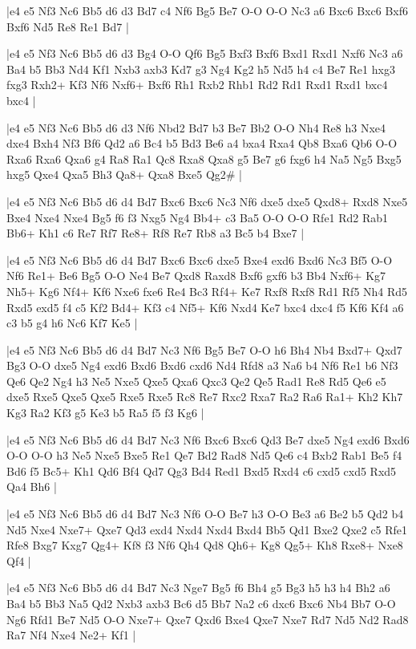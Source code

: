 \whitename{}
\blackname{}
\makegametitle
|e4 e5 Nf3 Nc6 Bb5 d6 d3 Bd7 c4 Nf6 Bg5 Be7 O-O O-O Nc3 a6 Bxc6 Bxc6 Bxf6 Bxf6 Nd5 Re8 Re1 Bd7  |

\whitename{}
\blackname{}
\makegametitle
|e4 e5 Nf3 Nc6 Bb5 d6 d3 Bg4 O-O Qf6 Bg5 Bxf3 Bxf6 Bxd1 Rxd1 Nxf6 Nc3 a6 Ba4 b5 Bb3 Nd4 Kf1 Nxb3 axb3 Kd7 g3 Ng4 Kg2 h5 Nd5 h4 c4 Be7 Re1 hxg3 fxg3 Rxh2+ Kf3 Nf6 Nxf6+ Bxf6 Rh1 Rxb2 Rhb1 Rd2 Rd1 Rxd1 Rxd1 bxc4 bxc4  |

\whitename{}
\blackname{}
\makegametitle
|e4 e5 Nf3 Nc6 Bb5 d6 d3 Nf6 Nbd2 Bd7 b3 Be7 Bb2 O-O Nh4 Re8 h3 Nxe4 dxe4 Bxh4 Nf3 Bf6 Qd2 a6 Bc4 b5 Bd3 Be6 a4 bxa4 Rxa4 Qb8 Bxa6 Qb6 O-O Rxa6 Rxa6 Qxa6 g4 Ra8 Ra1 Qc8 Rxa8 Qxa8 g5 Be7 g6 fxg6 h4 Na5 Ng5 Bxg5 hxg5 Qxe4 Qxa5 Bh3 Qa8+ Qxa8 Bxe5 Qg2\#  |

\whitename{}
\blackname{}
\makegametitle
|e4 e5 Nf3 Nc6 Bb5 d6 d4 Bd7 Bxc6 Bxc6 Nc3 Nf6 dxe5 dxe5 Qxd8+ Rxd8 Nxe5 Bxe4 Nxe4 Nxe4 Bg5 f6 f3 Nxg5 Ng4 Bb4+ c3 Ba5 O-O O-O Rfe1 Rd2 Rab1 Bb6+ Kh1 c6 Re7 Rf7 Re8+ Rf8 Re7 Rb8 a3 Bc5 b4 Bxe7  |

\whitename{}
\blackname{}
\makegametitle
|e4 e5 Nf3 Nc6 Bb5 d6 d4 Bd7 Bxc6 Bxc6 dxe5 Bxe4 exd6 Bxd6 Nc3 Bf5 O-O Nf6 Re1+ Be6 Bg5 O-O Ne4 Be7 Qxd8 Raxd8 Bxf6 gxf6 b3 Bb4 Nxf6+ Kg7 Nh5+ Kg6 Nf4+ Kf6 Nxe6 fxe6 Re4 Bc3 Rf4+ Ke7 Rxf8 Rxf8 Rd1 Rf5 Nh4 Rd5 Rxd5 exd5 f4 c5 Kf2 Bd4+ Kf3 c4 Nf5+ Kf6 Nxd4 Ke7 bxc4 dxc4 f5 Kf6 Kf4 a6 c3 b5 g4 h6 Nc6 Kf7 Ke5  |

\whitename{}
\blackname{}
\makegametitle
|e4 e5 Nf3 Nc6 Bb5 d6 d4 Bd7 Nc3 Nf6 Bg5 Be7 O-O h6 Bh4 Nb4 Bxd7+ Qxd7 Bg3 O-O dxe5 Ng4 exd6 Bxd6 Bxd6 cxd6 Nd4 Rfd8 a3 Na6 b4 Nf6 Re1 b6 Nf3 Qe6 Qe2 Ng4 h3 Ne5 Nxe5 Qxe5 Qxa6 Qxc3 Qe2 Qe5 Rad1 Re8 Rd5 Qe6 e5 dxe5 Rxe5 Qxe5 Qxe5 Rxe5 Rxe5 Rc8 Re7 Rxc2 Rxa7 Ra2 Ra6 Ra1+ Kh2 Kh7 Kg3 Ra2 Kf3 g5 Ke3 b5 Ra5 f5 f3 Kg6  |

\whitename{}
\blackname{}
\makegametitle
|e4 e5 Nf3 Nc6 Bb5 d6 d4 Bd7 Nc3 Nf6 Bxc6 Bxc6 Qd3 Be7 dxe5 Ng4 exd6 Bxd6 O-O O-O h3 Ne5 Nxe5 Bxe5 Re1 Qe7 Bd2 Rad8 Nd5 Qe6 c4 Bxb2 Rab1 Be5 f4 Bd6 f5 Bc5+ Kh1 Qd6 Bf4 Qd7 Qg3 Bd4 Red1 Bxd5 Rxd4 c6 cxd5 cxd5 Rxd5 Qa4 Bh6  |

\whitename{}
\blackname{}
\makegametitle
|e4 e5 Nf3 Nc6 Bb5 d6 d4 Bd7 Nc3 Nf6 O-O Be7 h3 O-O Be3 a6 Be2 b5 Qd2 b4 Nd5 Nxe4 Nxe7+ Qxe7 Qd3 exd4 Nxd4 Nxd4 Bxd4 Bb5 Qd1 Bxe2 Qxe2 c5 Rfe1 Rfe8 Bxg7 Kxg7 Qg4+ Kf8 f3 Nf6 Qh4 Qd8 Qh6+ Kg8 Qg5+ Kh8 Rxe8+ Nxe8 Qf4  |

\whitename{}
\blackname{}
\makegametitle
|e4 e5 Nf3 Nc6 Bb5 d6 d4 Bd7 Nc3 Nge7 Bg5 f6 Bh4 g5 Bg3 h5 h3 h4 Bh2 a6 Ba4 b5 Bb3 Na5 Qd2 Nxb3 axb3 Bc6 d5 Bb7 Na2 c6 dxc6 Bxc6 Nb4 Bb7 O-O Ng6 Rfd1 Be7 Nd5 O-O Nxe7+ Qxe7 Qxd6 Bxe4 Qxe7 Nxe7 Rd7 Nd5 Nd2 Rad8 Ra7 Nf4 Nxe4 Ne2+ Kf1  |

